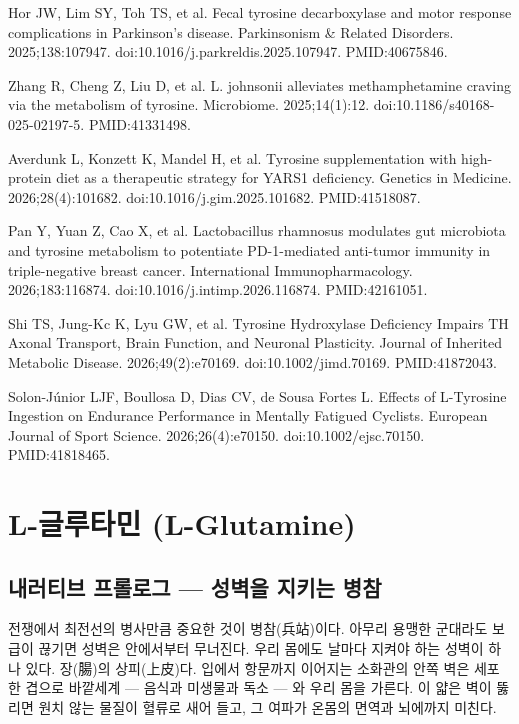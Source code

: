 \documentclass[12pt,oneside]{book}
\newcommand{\refend}{\endgroup\par}
\newcommand{\reff}[2]{\par\hangindent=7mm\hangafter=1\noindent[#1]\hspace{2mm}#2\par}
\begin{document}
\reff{27}{Hor JW, Lim SY, Toh TS, et al. Fecal tyrosine decarboxylase and motor response complications in Parkinson's disease. Parkinsonism \& Related Disorders. 2025;138:107947. doi:10.1016/j.parkreldis.2025.107947. PMID:40675846.}

\reff{28}{Zhang R, Cheng Z, Liu D, et al. L. johnsonii alleviates methamphetamine craving via the metabolism of tyrosine. Microbiome. 2025;14(1):12. doi:10.1186/s40168-025-02197-5. PMID:41331498.}

\reff{29}{Averdunk L, Konzett K, Mandel H, et al. Tyrosine supplementation with high-protein diet as a therapeutic strategy for YARS1 deficiency. Genetics in Medicine. 2026;28(4):101682. doi:10.1016/j.gim.2025.101682. PMID:41518087.}

\reff{30}{Pan Y, Yuan Z, Cao X, et al. Lactobacillus rhamnosus modulates gut microbiota and tyrosine metabolism to potentiate PD-1-mediated anti-tumor immunity in triple-negative breast cancer. International Immunopharmacology. 2026;183:116874. doi:10.1016/j.intimp.2026.116874. PMID:42161051.}

\reff{31}{Shi TS, Jung-Kc K, Lyu GW, et al. Tyrosine Hydroxylase Deficiency Impairs TH Axonal Transport, Brain Function, and Neuronal Plasticity. Journal of Inherited Metabolic Disease. 2026;49(2):e70169. doi:10.1002/jimd.70169. PMID:41872043.}

\reff{32}{Solon-Júnior LJF, Boullosa D, Dias CV, de Sousa Fortes L. Effects of L-Tyrosine Ingestion on Endurance Performance in Mentally Fatigued Cyclists. European Journal of Sport Science. 2026;26(4):e70150. doi:10.1002/ejsc.70150. PMID:41818465.}

\refend


\chapter{L-글루타민 (L-Glutamine)}

\section{내러티브 프롤로그 — 성벽을 지키는 병참}

전쟁에서 최전선의 병사만큼 중요한 것이 병참(兵站)이다. 아무리 용맹한 군대라도 보급이 끊기면 성벽은 안에서부터 무너진다. 우리 몸에도 날마다 지켜야 하는 성벽이 하나 있다. 장(腸)의 상피(上皮)다. 입에서 항문까지 이어지는 소화관의 안쪽 벽은 세포 한 겹으로 바깥세계 — 음식과 미생물과 독소 — 와 우리 몸을 가른다. 이 얇은 벽이 뚫리면 원치 않는 물질이 혈류로 새어 들고, 그 여파가 온몸의 면역과 뇌에까지 미친다.
\end{document}
